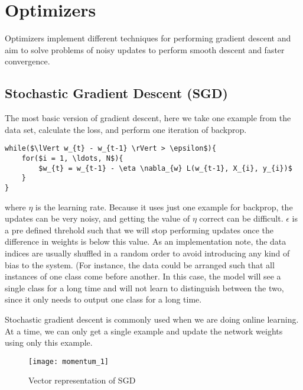 \documentclass[../../deep_learning_notes.tex]{subfiles}
\begin{document}
\section{Optimizers}
Optimizers implement different techniques for performing gradient descent and aim to solve problems of noisy updates to perform smooth descent and faster convergence.


\subsection{Stochastic Gradient Descent (SGD)}
The most basic version of gradient descent, here we take one example from the data set, calculate the loss, and perform one iteration of backprop.
\begin{lstlisting}
while($\lVert w_{t} - w_{t-1} \rVert > \epsilon$){
    for($i = 1, \ldots, N$){
        $w_{t} = w_{t-1} - \eta \nabla_{w} L(w_{t-1}, X_{i}, y_{i})$
    }
}
\end{lstlisting}
where $\eta$ is the learning rate. Because it uses just one example for backprop, the updates can be very noisy, and getting the value of $\eta$ correct can be difficult. $\epsilon$ is a pre defined threhold such that we will stop performing updates once the difference in weights is below this value.\newline
As an implementation note, the data indices are usually shuffled in a random order to avoid introducing any kind of bias to the system. (For instance, the data could be arranged such that all instances of one class come before another. In this case, the model will see a single class for a long time and will not learn to distinguish between the two, since it only needs to output one class for a long time.\newline

Stochastic gradient descent is commonly used when we are doing online learning. At a time, we can only get a single example and update the network weights using only this example.

\begin{figure}[h]
    \texttt{[image: momentum\_1]}
    \centering
    \caption {Vector representation of SGD}
    \label{fig:momentum_1} %
\end{figure}

\end{document}
